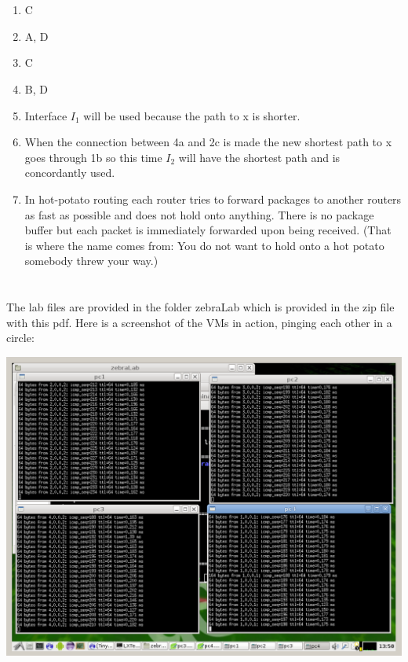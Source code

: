 \documentclass[12pt, a4paper]{article}
\begin{document}
\section{} %
\begin{enumerate}[1]
	\item %
	C

	\item %
	A, D

	\item %
	C

	\item %
	B, D

	\item %
	Interface $I_1$ will be used because the path to x is shorter.

	\item %
	When the connection between 4a and 2c is made the new shortest path to x goes through 1b so this time $I_2$ will have the shortest path and is concordantly used.

	\item %
	In hot-potato routing each router tries to forward packages to another routers as fast as possible and does not hold onto anything. There is no package buffer but each packet is immediately forwarded upon being received. (That is where the name comes from: You do not want to hold onto a hot potato somebody threw your way.)
\end{enumerate}

\section{} %
The lab files are provided in the folder zebraLab which is provided in the zip file with this pdf. Here is a screenshot of the VMs in action, pinging each other in a circle:

\includegraphics[width=\linewidth]{screenshots/netkit}
\end{document}
